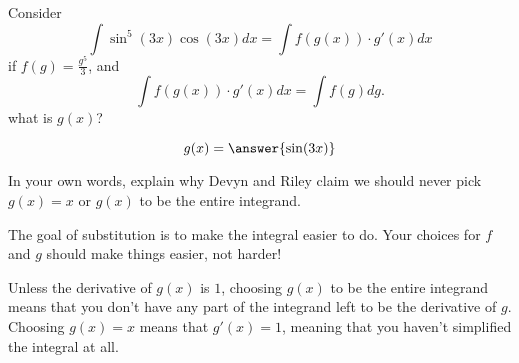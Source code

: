 \documentclass{ximera}
\begin{document}
\begin{problem}
  Consider
  \[
  \int \sin^5(3x) \cos(3x) dx = \int f(g(x)) \cdot g'(x) dx
  \]
  if $f(g) = \frac{g^5}{3}$, and 
  \[
  \int f(g(x)) \cdot g'(x) dx = \int f(g) dg.
  \]
  what is $g(x)$?
  \begin{prompt}
    \[
    g(x) = \answer{\sin(3 x)}
    \]
  \end{prompt}
\end{problem}

\begin{problem}
	In your own words, explain why Devyn and Riley claim we should never 
	pick $g(x) = x$ or $g(x)$ to be the entire integrand.
	\begin{freeResponse}
		The goal of substitution is to make the integral easier to do.  Your choices
		for $f$ and $g$ should make things easier, not harder!
	
		Unless the derivative of $g(x)$ is $1$, choosing $g(x)$ to be the entire
		integrand means that you don't have any part of the integrand left to be
		the derivative of $g$.  Choosing $g(x) = x$ means that $g'(x) = 1$, meaning
		that you haven't simplified the integral at all.  
	\end{freeResponse}
\end{problem}

%
\end{document}
